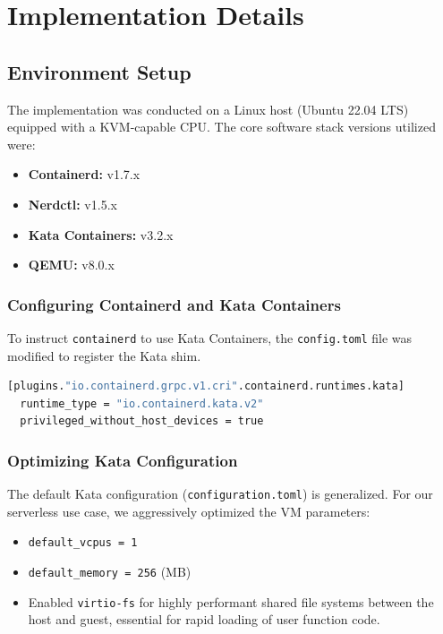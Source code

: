 \documentclass[12pt,a4paper]{report}
\begin{document}
\chapter{Implementation Details}

\section{Environment Setup}
The implementation was conducted on a Linux host (Ubuntu 22.04 LTS) equipped with a KVM-capable CPU. The core software stack versions utilized were:
\begin{itemize}
    \item \textbf{Containerd:} v1.7.x
    \item \textbf{Nerdctl:} v1.5.x
    \item \textbf{Kata Containers:} v3.2.x
    \item \textbf{QEMU:} v8.0.x
\end{itemize}

\subsection{Configuring Containerd and Kata Containers}
To instruct \texttt{containerd} to use Kata Containers, the \texttt{config.toml} file was modified to register the Kata shim.

\begin{lstlisting}[language=bash, caption={Containerd configuration snippet}]
[plugins."io.containerd.grpc.v1.cri".containerd.runtimes.kata]
  runtime_type = "io.containerd.kata.v2"
  privileged_without_host_devices = true
\end{lstlisting}

\subsection{Optimizing Kata Configuration}
The default Kata configuration (\texttt{configuration.toml}) is generalized. For our serverless use case, we aggressively optimized the VM parameters:
\begin{itemize}
    \item \texttt{default\_vcpus = 1}
    \item \texttt{default\_memory = 256} (MB)
    \item Enabled \texttt{virtio-fs} for highly performant shared file systems between the host and guest, essential for rapid loading of user function code.
\end{itemize}
\end{document}
